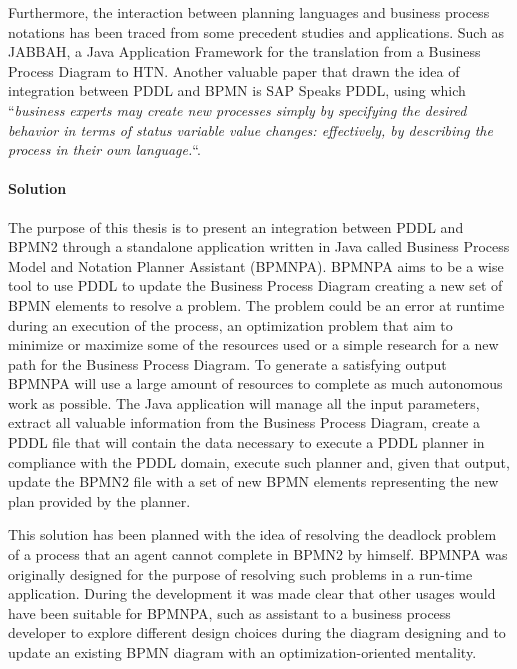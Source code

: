 Furthermore, the interaction between planning languages and business process notations has been traced from some precedent studies and applications. 
Such as JABBAH, a Java Application Framework for the translation from a Business Process Diagram to HTN\cite{gonzalez2009jabbah}. 
Another valuable paper that drawn the idea of integration between PDDL and BPMN is SAP Speaks PDDL, using which ``\textit{business  experts  may  create new processes simply by specifying the desired behavior in terms of status variable value changes:  effectively, by describing the process in their own language.}``\cite{hoffmann2012sap}. 


\paragraph{Solution}
The purpose of this thesis is to present an integration between PDDL and BPMN2 through a standalone application written in Java called Business Process Model and Notation Planner Assistant (BPMNPA).
BPMNPA aims to be a wise tool to use PDDL to update the Business Process Diagram creating a new set of BPMN elements  to resolve a problem. 
The problem could be an error at runtime during an execution of the process, an optimization problem that aim to minimize or maximize some of the resources used or a simple research for a new path for the Business Process Diagram. 
To generate a satisfying output BPMNPA will use a large amount of resources to complete as much autonomous work as possible. 
The Java application will manage all the input parameters, extract all valuable information from the Business Process Diagram, create a PDDL file that will contain the data necessary to execute a PDDL planner in compliance with the PDDL domain, execute such planner and, given that output, update the BPMN2 file with a set of new BPMN elements representing the new plan provided by the planner.


This solution has been planned with the idea of resolving the deadlock problem of a process that an agent cannot complete in BPMN2 by himself. 
BPMNPA was originally designed for the purpose of resolving such problems in a run-time application. 
During the development it was made clear that other usages would have been suitable for BPMNPA, such as assistant to a business process developer to explore different design choices during the diagram designing and to update an existing BPMN diagram with an optimization-oriented mentality.

